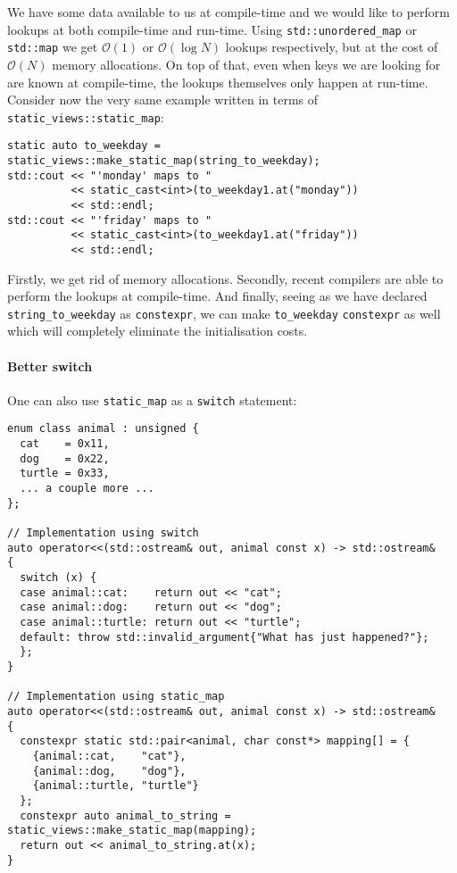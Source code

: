 \documentclass[a4paper,12pt]{article}
\begin{document}
    \noindent We have some data available to us at compile-time and we would
    like to perform lookups at both compile-time and run-time. Using
    \texttt{std::unordered\_map} or \texttt{std::map} we get $\mathcal{O}(1)$ or
    $\mathcal{O}(\log N)$ lookups respectively, but at the cost of
    $\mathcal{O}(N)$ memory allocations. On top of that, even when keys we are
    looking for are known at compile-time, the lookups themselves only happen at
    run-time. Consider now the very same example written in terms of
    \texttt{static\_views::static\_map}:
\begin{spacing}{0.8}
\begin{lstlisting}
static auto to_weekday = static_views::make_static_map(string_to_weekday);
std::cout << "'monday' maps to "
          << static_cast<int>(to_weekday1.at("monday"))
          << std::endl;
std::cout << "'friday' maps to "
          << static_cast<int>(to_weekday1.at("friday"))
          << std::endl;
\end{lstlisting}
\end{spacing}
    \noindent Firstly, we get rid of memory allocations. Secondly, recent
    compilers are able to perform the lookups at compile-time. And finally,
    seeing as we have declared \texttt{string\_to\_weekday} as
    \texttt{constexpr}, we can make \texttt{to\_weekday} \texttt{constexpr} as
    well which will completely eliminate the initialisation costs.

    \paragraph{Better switch} One can also use \texttt{static\_map} as a
    \texttt{switch} statement:

\begin{spacing}{0.8}
\begin{lstlisting}
enum class animal : unsigned {
  cat    = 0x11,
  dog    = 0x22,
  turtle = 0x33,
  ... a couple more ...
};

// Implementation using switch
auto operator<<(std::ostream& out, animal const x) -> std::ostream&
{
  switch (x) {
  case animal::cat:    return out << "cat";
  case animal::dog:    return out << "dog";
  case animal::turtle: return out << "turtle";
  default: throw std::invalid_argument{"What has just happened?"};
  };
}

// Implementation using static_map
auto operator<<(std::ostream& out, animal const x) -> std::ostream&
{
  constexpr static std::pair<animal, char const*> mapping[] = {
    {animal::cat,    "cat"},
    {animal::dog,    "dog"},
    {animal::turtle, "turtle"}
  };
  constexpr auto animal_to_string = static_views::make_static_map(mapping);
  return out << animal_to_string.at(x);
}
\end{lstlisting}
\end{spacing}
\end{document}
